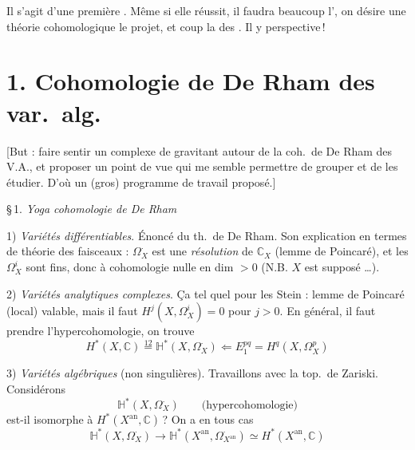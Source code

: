 \documentclass[11pt,a4paper]{article}
\begin{document}
Il s'agit d'une première \struck{\ill{}}. \struck{\ill{}} Même si elle
réussit, il faudra beaucoup l', on \ill{} désire une
théorie cohomologique \ill{} \ill{} le projet, et \ill{} \ill{}
 \ill{} \ill{} coup la \ill{} des \ill{}. Il y \ill{}
\ill{} \ill{} \ill{} \ill{} perspective\,!



\section*{1. Cohomologie de De Rham des var.\ alg.}

[But : faire sentir un complexe de  gravitant autour de la
coh.\ de De Rham des V.A., et proposer un point de vue qui \struck{\ill{}}
me semble permettre de  grouper et de les étudier. D'où un
(gros) programme de travail proposé.]

§\,1. \emph{Yoga cohomologie de De Rham}

1) \emph{Variétés différentiables}. Énoncé du th.\ de De Rham. Son
explication en termes de théorie des faisceaux : \struck{\ill{}}
$\Omega^{\cdot}_{X}$ est une \emph{résolution} de $\mathbb{C}_X$ (lemme de
Poincaré), et les $\Omega^{i}_{X}$ sont fins, donc à cohomologie nulle en
dim $> 0$ (N.B. $X$ est supposé \ldots).

2) \emph{Variétés analytiques complexes}. Ça \ill{} \ill{} tel quel pour
les Stein : lemme de Poincaré (local) valable, mais il faut
$H^{j}(X, \Omega^{i}_{X}) = 0$ pour $j > 0$. En général, il faut prendre
l'hypercohomologie, on trouve
\[
  H^{*}(X, \mathbb{C}) \overset{\text{12}}{=}
  \mathbb{H}^{*}(X, \Omega^{\cdot}_{X})
  \Longleftarrow E_1^{pq} = H^{q}(X, \Omega^{p}_{X})
\]

3) \emph{Variétés algébriques} (non singulières). Travaillons avec la
top.\ de Zariski. Considérons
\[
  \mathbb{H}^{*}(X, \Omega^{\cdot}_{X}) \qquad \text{(hypercohomologie)}
\]
est-il isomorphe à $H^{*}(X^{\mathrm{an}}, \mathbb{C})$\,? On a en tous cas
\[
  \mathbb{H}^{*}(X, \Omega^{\cdot}_{X}) \longrightarrow
  \mathbb{H}^{*}(X^{\mathrm{an}}, \Omega^{\cdot}_{X^{\mathrm{an}}})
  \simeq H^{*}(X^{\mathrm{an}}, \mathbb{C})
\]
\end{document}
